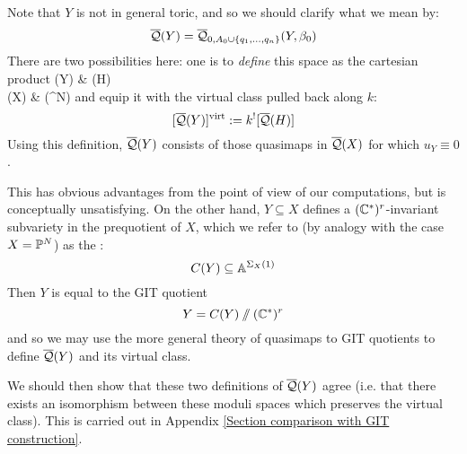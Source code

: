 \begin{remark} \label{GIT comparison remark} Note that $Y$ is not in general toric, and so we should clarify what we mean by:
\begin{equation*} \overline{\mathcal{Q}}(Y) = \overline{\mathcal Q}_{0,A_0 \cup \{ q_1, \ldots, q_n \}}(Y,\beta_0) \end{equation*}
There are two possibilities here: one is to \emph{define} this space as the cartesian product
\bcd
{}(Y) \ar[r] \ar[d]  & (H) \ar[d] \\
(X) \ar[r,"k"] & (\PP^N)
\ecd
and equip it with the virtual class pulled back along $k$:
\begin{equation*} [\overline{\mathcal{Q}}(Y)]^{\operatorname{virt}} := k^! [ \overline{\mathcal{Q}}(H) ] \end{equation*}
Using this definition, $\overline{\mathcal{Q}}(Y)$ consists of those quasimaps in $\overline{\mathcal{Q}}(X)$ for which $u_Y \equiv 0$.

This has obvious advantages from the point of view of our computations, but is conceptually unsatisfying. On the other hand, $Y \subseteq X$ defines a $(\mathbb{C}^*)^r$-invariant subvariety in the prequotient of $X$, which we refer to (by analogy with the case $X=\mathbb P^N$) as the :
\begin{equation*} C(Y) \subseteq \mathbb{A}^{\Sigma_X(1)} \end{equation*}
Then $Y$ is equal to the GIT quotient
\begin{equation*} Y = C(Y) \sslash (\mathbb{C}^*)^r \end{equation*}
and so we may use the more general theory of quasimaps to GIT quotients \cite{CFKM} to define $\overline{\mathcal{Q}}(Y)$ and its virtual class.

We should then show that these two definitions of $\overline{\mathcal{Q}}(Y)$ agree (i.e. that there exists an isomorphism between these moduli spaces which preserves the virtual class). This is carried out in Appendix \ref{Section comparison with GIT construction}.
\end{remark}

